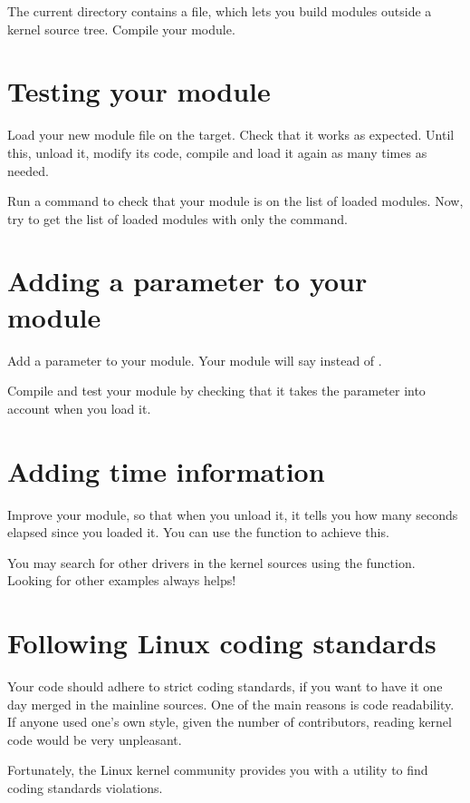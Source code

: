The current directory contains a  file, which lets you
build modules outside a kernel source tree.  Compile your module.

\section{Testing your module}

Load your new module file on the target. Check that it works as
expected. Until this, unload it, modify its code, compile and load it
again as many times as needed.

Run a command to check that your module is on the list of loaded
modules. Now, try to get the list of loaded modules with only the
 command.

\section{Adding a parameter to your module}

Add a  parameter to your module. Your module will say
 instead of .

Compile and test your module by checking that it takes the 
parameter into account when you load it.

\section{Adding time information}

Improve your module, so that when you unload it, it tells you how many
seconds elapsed since you loaded it.  You can use the
 function to achieve this.

You may search for other drivers in the kernel sources using the
 function. Looking for other examples always helps!

\section{Following Linux coding standards}

Your code should adhere to strict coding standards, if you want to
have it one day merged in the mainline sources. One of the main
reasons is code readability. If anyone used one's own style, given the
number of contributors, reading kernel code would be very unpleasant.

Fortunately, the Linux kernel community provides you with a utility to
find coding standards violations.

